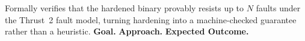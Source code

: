 \subsubsection{\researchthreethree}
Formally verifies that the hardened binary provably resists up to $N$ faults under the Thrust~2 fault model, turning hardening into a machine-checked guarantee rather than a heuristic.
\noindent\textbf{Goal.} %
\noindent\textbf{Approach.} %
\noindent\textbf{Expected Outcome.} %
